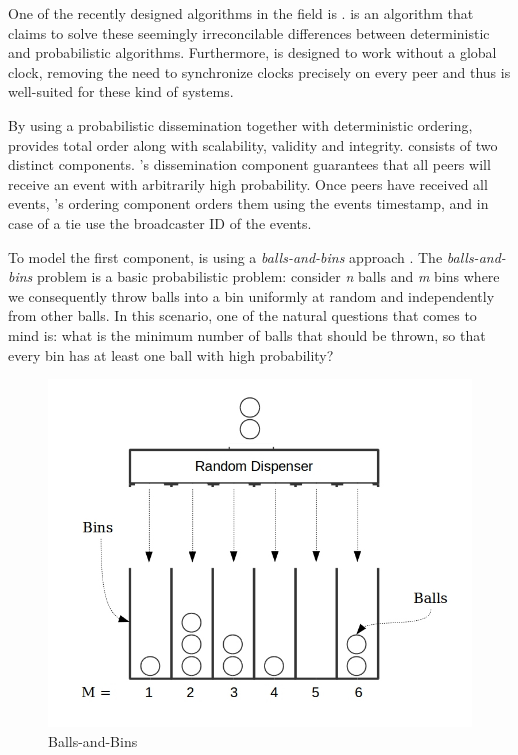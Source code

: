 One of the recently designed algorithms in the field is \epto \autocite{matos2015epto}. \epto is an algorithm that claims to solve these seemingly irreconcilable
differences between deterministic and probabilistic algorithms. Furthermore, \epto is designed to work without a global clock, removing the need to synchronize clocks precisely on every peer and thus is well-suited for these kind of systems.
\par
By using a probabilistic dissemination together with deterministic ordering, \epto provides total order along with scalability, validity and integrity. \epto consists of two distinct components. \epto's dissemination component guarantees that all peers will receive an event with arbitrarily high probability. Once peers have received all events, \epto's ordering component orders them using the events timestamp, and in case of a tie use the broadcaster ID of the events.
\par
To model the first component, \epto is using a \textit{balls-and-bins} approach \autocite{Koldehofe02simplegossiping}. The \textit{balls-and-bins} problem is a basic probabilistic problem: consider \textit{n} balls and \textit{m} bins where we consequently throw balls into a bin uniformly at random and independently from other balls. In this scenario, one of the natural questions that comes to mind is: what is the minimum number of balls that should be thrown, so that every bin has at least one ball with high probability?
\begin{figure}
	\includegraphics[width=\linewidth]{figures/BnB.jpeg}
	\caption[Caption]{Balls-and-Bins\footnotemark}
	\label{fig:balls-and-bins}
\end{figure}
